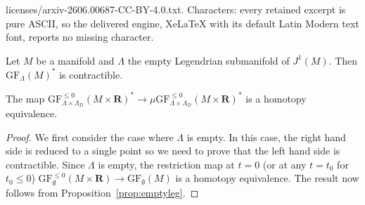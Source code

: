 \documentclass[10pt,a4paper]{amsart}
\newcommand{\GF}{\mathrm{GF}}
\newcommand{\R}{\mathbf{R}}
\begin{document}
licenses/arxiv-2606.00687-CC-BY-4.0.txt. Characters: every retained excerpt is pure ASCII, so the delivered engine, XeLaTeX with its default Latin Modern text font, reports no missing character.
\begin{prop}\label{prop:emptyleg}
Let $M$ be a manifold and $\Lambda$ the empty Legendrian submanifold of $J^1(M)$. Then $\GF_\Lambda(M)^*$ is contractible.
\end{prop}

\begin{thm}\label{thm:GFdoubling}
The map $\GF^{\leq 0}_{\Lambda\times \Lambda_D}(M\times \R)^* \to \mu\GF^{\leq 0}_{\Lambda\times \Lambda_D}(M\times \R)^*$ is a homotopy equivalence.
\end{thm}

\begin{proof}
We first consider the case where $\Lambda$ is empty. In this case, the right hand side is reduced to a single point so we need to prove
that the left hand side is contractible.
Since $\Lambda$ is empty, the restriction map at $t=0$ (or at any $t=t_0$ for $t_0\leq 0$) $\GF^{\leq 0}_\emptyset(M\times \R) \to \GF_\emptyset(M)$
is a homotopy equivalence. The result now follows from Proposition~\ref{prop:emptyleg}.


\end{proof}
\end{document}
